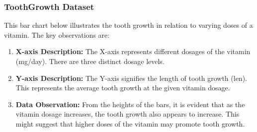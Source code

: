 \documentclass{article}\usepackage[]{graphicx}\usepackage[]{xcolor}
\begin{document}
\subsubsection{ToothGrowth Dataset}

This bar chart below illustrates the tooth growth in relation to varying doses of a vitamin. The key observations are:

\begin{enumerate}
    \item \textbf{X-axis Description:} The X-axis represents different dosages of the vitamin (mg/day). There are three distinct dosage levels.
    
    \item \textbf{Y-axis Description:} The Y-axis signifies the length of tooth growth (len). This represents the average tooth growth at the given vitamin dosage.
    \item \textbf{Data Observation:} From the heights of the bars, it is evident that as the vitamin dosage increases, the tooth growth also appears to increase. This might suggest that higher doses of the vitamin may promote tooth growth.
\end{enumerate}
\end{document}
